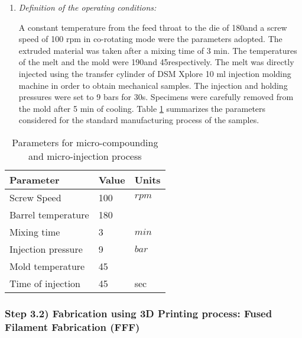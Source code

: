 \begin{enumerate}[leftmargin=0in, label=\emph{\alph*}.]
	\item  \textit{Definition of the operating conditions:}
	
	A constant temperature from the feed throat to the die of 180\Celsius and a screw speed of 100 rpm in co-rotating mode were the parameters adopted. 
	The extruded material was taken  after a mixing time of 3 min.
	The temperatures of the melt and the mold were 190\Celsius and 45\Celsius respectively.   
	The melt was directly injected using the transfer cylinder of DSM Xplore 10 ml injection molding machine  in order to obtain mechanical samples. 
	The injection and holding pressures were set to 9 bars for 30s. 
	Specimens were carefully removed from the mold after 5 min of cooling. 
	Table \ref{parameters.compounding} summarizes the parameters considered for the standard manufacturing process of the samples.

\end{enumerate}


\begin{table}[H]
	\centering
	\caption{Parameters for micro-compounding and micro-injection process}  
	\begin{tabular}{lll}
		\toprule
		\textbf{Parameter}   & \textbf{Value}  & \textbf{Units}  \\  
		\midrule 
		Screw Speed   & 100 &   $rpm$   \\
		Barrel temperature & 180 & \Celsius	 \\
		Mixing time & 3 & $min$ \\
		Injection pressure & 9 & $bar$ \\
		Mold temperature & 45 &  \Celsius \\
		Time of injection & 45 & sec  \\
		\bottomrule
	\end{tabular}%
	\label{parameters.compounding}%
\end{table}%


\subsubsection{Step 3.2) Fabrication using 3D Printing process: Fused Filament Fabrication (FFF)}
\label{Fabrication:3DP.parameters}

